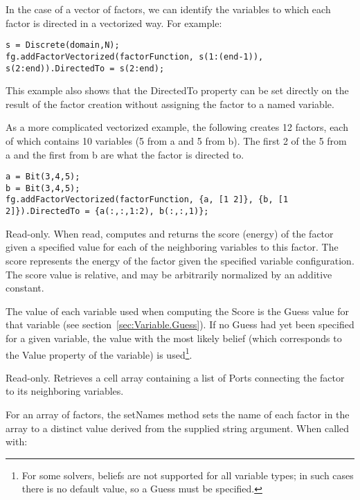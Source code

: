 In the case of a vector of factors, we can identify the variables to which each factor is directed in a vectorized way.  For example:

\begin{lstlisting}
s = Discrete(domain,N);
fg.addFactorVectorized(factorFunction, s(1:(end-1)), s(2:end)).DirectedTo = s(2:end);
\end{lstlisting}

This example also shows that the DirectedTo property can be set directly on the result of the factor creation without assigning the factor to a named variable.

As a more complicated vectorized example, the following creates 12 factors, each of which contains 10 variables (5 from a and 5 from b).  The first 2 of the 5 from a and the first from b are what the factor is directed to.

\begin{lstlisting}
a = Bit(3,4,5);
b = Bit(3,4,5);
fg.addFactorVectorized(factorFunction, {a, [1 2]}, {b, [1 2]}).DirectedTo = {a(:,:,1:2), b(:,:,1)};
\end{lstlisting}
\fi

\label{sec:Factor.Score}

Read-only.  When read, computes and returns the score (energy) of the factor given a specified value for each of the neighboring variables to this factor.  The score represents the energy of the factor given the specified variable configuration.  The score value is relative, and may be arbitrarily normalized by an additive constant.

The value of each variable used when computing the Score is the Guess value for that variable (see section~\ref{sec:Variable.Guess}).  If no Guess had yet been specified for a given variable, the value with the most likely belief (which corresponds to the Value property of the variable) is used\footnote{For some solvers, beliefs are not supported for all variable types; in such cases there is no default value, so a Guess must be specified.}.



Read-only.  Retrieves a cell array containing a list of Ports connecting the factor to its neighboring variables.


\ifmatlab
{}

\label{sec:Factor.setNames}

For an array of factors, the setNames method sets the name of each factor in the array to a distinct value derived from the supplied string argument.  When called with:

